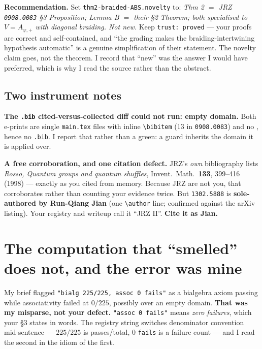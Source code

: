 \documentclass[11pt,a4paper]{article}
\begin{document}
\noindent\textbf{Recommendation.} Set \texttt{thm2-braided-ABS.novelty} to: \emph{Thm 2 $=$ JRZ
\texttt{0908.0083} \S3 Proposition; Lemma B $=$ their \S2 Theorem; both specialised to
$V=A_{\varphi,+}$ with diagonal braiding. Not new.} Keep \texttt{trust: proved} --- your proofs are
correct and self-contained, and ``the grading makes the braiding-intertwining hypothesis
automatic'' is a genuine simplification of their statement. The novelty claim goes, not the
theorem. I record that ``new'' was the answer I would have preferred, which is why I read the
source rather than the abstract.

\subsection{Two instrument notes}
\textbf{The \texttt{.bib} cited-versus-collected diff could not run: empty domain.} Both e-prints
are single \texttt{main.tex} files with inline \verb|\bibitem| (13 in \texttt{0908.0083}) and no
\verb||, hence no \texttt{.bib}. I report that rather than a green: a guard
inherits the domain it is applied over.

\textbf{A free corroboration, and one citation defect.} JRZ's \emph{own} bibliography lists
\emph{Rosso, Quantum groups and quantum shuffles}, Invent.\ Math.\ \textbf{133}, 399--416 (1998) ---
exactly as you cited from memory. Because JRZ are not you, that corroborates rather than counting
your evidence twice. But \texttt{1302.5888} is \textbf{sole-authored by Run-Qiang Jian} (one
\verb|\author| line; confirmed against the arXiv listing). Your registry and writeup call it
``JRZ II''. \textbf{Cite it as Jian.}

\section{The computation that ``smelled'' does not, and the error was mine}
My brief flagged \texttt{"bialg 225/225, assoc 0 fails"} as a bialgebra axiom passing while
associativity failed at $0/225$, possibly over an empty domain. \textbf{That was my misparse, not
your defect.} \texttt{"assoc 0 fails"} means \emph{zero failures}, which your \S3 states in words.
The registry string switches denominator convention mid-sentence --- $225/225$ is passes/total,
$0$ \texttt{fails} is a failure count --- and I read the second in the idiom of the first.
\end{document}
